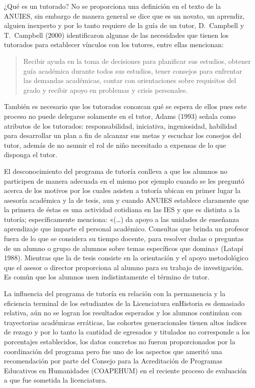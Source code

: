 \enlargethispage{-1\baselineskip}
¿Qué es un tutorado? No se proporciona una definición en el texto de la
ANUIES, sin embargo de manera general se dice que es un novato, un
aprendiz, alguien inexperto y por lo tanto requiere de la guía de un tutor,
D.\ Campbell y T.\ Campbell (2000) identificaron algunas de las necesidades
que tienen los tutorados para establecer vínculos con los tutores, entre
ellas mencionan:  

\begin{quotation}
Recibir ayuda en la toma de decisiones para planificar
sus estudios, obtener guía académica durante todos sus estudios, tener
consejos para enfrentar las demandas académicas, contar con orientaciones
sobre requisitos del grado y recibir apoyo en problemas y crisis
personales.
\end{quotation}

También es necesario que los tutorados conozcan qué se espera de ellos pues
este proceso no puede delegarse solamente en el tutor, Adams (1993) señala
como atributos de los tutorados: responsabilidad, iniciativa, ingeniosidad,
habilidad para desarrollar un plan a fin de alcanzar sus metas y escuchar
los consejos del tutor, además de no asumir el rol de niño necesitado a
expensas de lo que disponga el tutor.


El desconocimiento del programa de tutoría conlleva a que los alumnos no
participen de manera adecuada en el mismo por ejemplo cuando se les
preguntó acerca de los motivos por los cuales asisten a tutoría  ubican en
primer lugar la asesoría académica y la de tesis, aun y cuando ANUIES
establece claramente que la primera de éstas es una actividad cotidiana en
las IES y que es distinta a la tutoría; específicamente menciona: «(\ldots) da
apoyo a las unidades de enseñanza aprendizaje que imparte el personal
académico. Consultas que  brinda un profesor fuera de lo que se considera
su tiempo docente, para resolver dudas o preguntas de un alumno o grupo de
alumnos sobre temas específicos que domina» (Latapí 1988). Mientras que la
de tesis consiste en la orientación y el apoyo metodológico que el asesor o
director proporciona al alumno para su trabajo de investigación. Es común
que los alumnos usen indistintamente el término de tutor.


La influencia del programa de tutoría en relación con la permanencia y la
eficiencia terminal de los estudiantes de la Licenciatura en\linebreak Historia es
demasiado relativa, aún no se logran los resultados esperados y los alumnos
continúan con trayectorias académicas erráticas, las cohortes
generacionales  tienen altos índices de rezago y por lo tanto la cantidad
de egresados y titulados no corresponde a los porcentajes establecidos, los
datos concretos no fueron proporcionados por la coordinación del programa
pero fue uno de los aspectos que ameritó una recomendación por parte del
Consejo para la Acreditación de Programas Educativos en Humanidades
(COAPEHUM) en el reciente proceso de evaluación a que fue sometida la
licenciatura.


